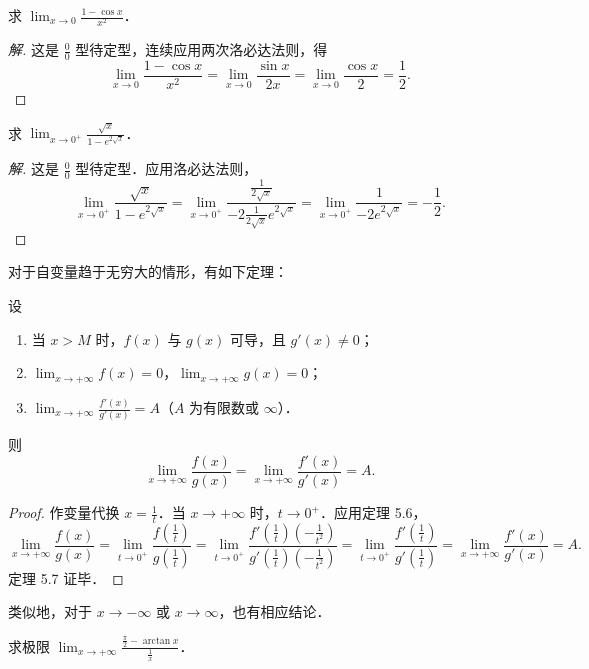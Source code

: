 \begin{example}
求 $\lim_{x\to0} \frac{1 - \cos x}{x^2}$．
\end{example}

\begin{proof}[解]
这是 $\frac{0}{0}$ 型待定型，连续应用两次洛必达法则，得
\[
\lim_{x\to0} \frac{1 - \cos x}{x^2} = \lim_{x\to0} \frac{\sin x}{2x} = \lim_{x\to0} \frac{\cos x}{2} = \frac{1}{2}.
\]
\end{proof}

\begin{example}
求 $\lim_{x\to0^+} \frac{\sqrt{x}}{1 - e^{2\sqrt{x}}}$．
\end{example}

\begin{proof}[解]
这是 $\frac{0}{0}$ 型待定型．应用洛必达法则，
\[
\lim_{x\to0^+} \frac{\sqrt{x}}{1 - e^{2\sqrt{x}}} = \lim_{x\to0^+} \frac{\frac{1}{2\sqrt{x}}}{-2\frac{1}{2\sqrt{x}}e^{2\sqrt{x}}} = \lim_{x\to0^+} \frac{1}{-2e^{2\sqrt{x}}} = -\frac{1}{2}.
\]
\end{proof}

对于自变量趋于无穷大的情形，有如下定理：

\begin{theorem}\label{thm:5-7}
设
\begin{enumerate}[(1)]
\item 当 $x > M$ 时，$f(x)$ 与 $g(x)$ 可导，且 $g'(x) \neq 0$；
\item $\lim_{x\to+\infty} f(x) = 0$，$\lim_{x\to+\infty} g(x) = 0$；
\item $\lim_{x\to+\infty} \frac{f'(x)}{g'(x)} = A$（$A$ 为有限数或 $\infty$）．
\end{enumerate}
则
\[
\lim_{x\to+\infty} \frac{f(x)}{g(x)} = \lim_{x\to+\infty} \frac{f'(x)}{g'(x)} = A.
\]
\end{theorem}

\begin{proof}
作变量代换 $x = \frac{1}{t}$．当 $x \to +\infty$ 时，$t \to 0^+$．应用定理 5.6，
\[
\lim_{x\to+\infty} \frac{f(x)}{g(x)} = \lim_{t\to0^+} \frac{f(\frac{1}{t})}{g(\frac{1}{t})} = \lim_{t\to0^+} \frac{f'(\frac{1}{t})(-\frac{1}{t^2})}{g'(\frac{1}{t})(-\frac{1}{t^2})} = \lim_{t\to0^+} \frac{f'(\frac{1}{t})}{g'(\frac{1}{t})} = \lim_{x\to+\infty} \frac{f'(x)}{g'(x)} = A.
\]
定理 5.7 证毕．
\end{proof}

类似地，对于 $x \to -\infty$ 或 $x \to \infty$，也有相应结论．

\begin{example}
求极限 $\lim_{x\to+\infty} \frac{\frac{\pi}{2} - \arctan x}{\frac{1}{x}}$．
\end{example}

